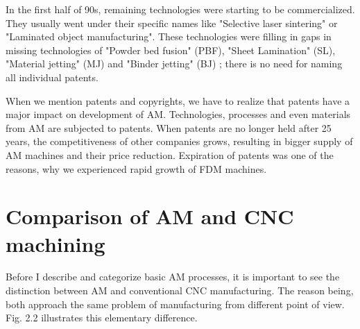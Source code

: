 \documentclass[a4paper, 11pt, reqno]{report}
\begin{document}
	In the first half of 90s, remaining technologies were starting to be commercialized. They usually went under their specific names like "Selective laser sintering" or  "Laminated object manufacturing". These technologies were filling in gaps in missing technologies of "Powder bed fusion" (PBF), "Sheet Lamination" (SL), "Material jetting" (MJ) and "Binder jetting" (BJ) ; there is no need for naming all individual patents.
	
	When we mention patents and copyrights, we have to realize that patents have a major impact on development of AM. Technologies, processes and even materials from AM are subjected to patents. When patents are no longer held after 25 years, the competitiveness of other companies grows, resulting in bigger supply of AM machines and their price reduction. Expiration of patents was one of the reasons, why we experienced rapid growth of FDM machines.

\section{Comparison of AM and CNC machining}
%
Before I describe and categorize basic AM processes, it is important to see the distinction between AM and conventional CNC manufacturing. The reason being, both approach the same problem of manufacturing from different point of view. Fig. 2.2 illustrates this elementary difference.
\end{document}
